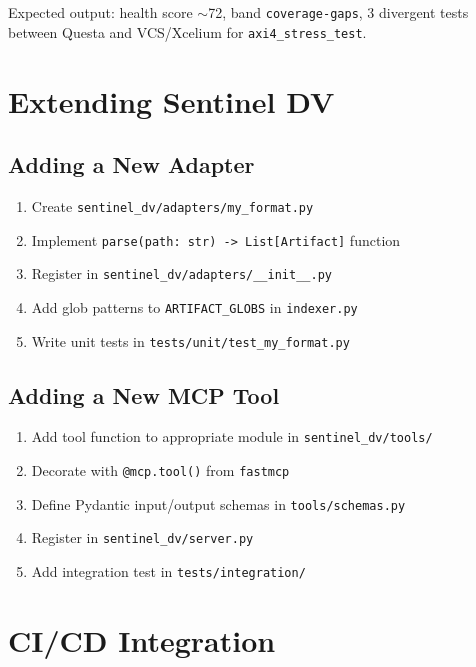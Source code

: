 \documentclass[11pt,a4paper]{article}
\begin{document}
Expected output: health score $\sim$72, band \texttt{coverage-gaps},
3 divergent tests between Questa and VCS/Xcelium for \texttt{axi4\_stress\_test}.

\section{Extending Sentinel DV}

\subsection{Adding a New Adapter}

\begin{enumerate}
  \item Create \texttt{sentinel\_dv/adapters/my\_format.py}
  \item Implement \texttt{parse(path: str) -> List[Artifact]} function
  \item Register in \texttt{sentinel\_dv/adapters/\_\_init\_\_.py}
  \item Add glob patterns to \texttt{ARTIFACT\_GLOBS} in \texttt{indexer.py}
  \item Write unit tests in \texttt{tests/unit/test\_my\_format.py}
\end{enumerate}

\subsection{Adding a New MCP Tool}

\begin{enumerate}
  \item Add tool function to appropriate module in \texttt{sentinel\_dv/tools/}
  \item Decorate with \texttt{@mcp.tool()} from \texttt{fastmcp}
  \item Define Pydantic input/output schemas in \texttt{tools/schemas.py}
  \item Register in \texttt{sentinel\_dv/server.py}
  \item Add integration test in \texttt{tests/integration/}
\end{enumerate}

\section{CI/CD Integration}
\end{document}
